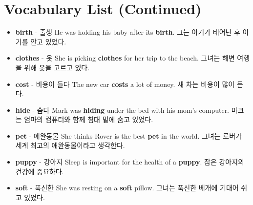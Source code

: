 \documentclass{article}
\begin{document}
\section*{Vocabulary List (Continued)}
\begin{addmargin}[1em]{1em}
    \begin{itemize}
        \item \fontsize{12pt}{14pt}\selectfont \textbf{birth} - 출생 \newline
        He was holding his baby after its \textbf{birth}. \newline
        그는 아기가 태어난 후 아기를 안고 있었다.
        
        \item \fontsize{12pt}{14pt}\selectfont \textbf{clothes} - 옷 \newline
        She is picking \textbf{clothes} for her trip to the beach. \newline
        그녀는 해변 여행을 위해 옷을 고르고 있다.
        
        \item \fontsize{12pt}{14pt}\selectfont \textbf{cost} - 비용이 들다 \newline
        The new car \textbf{costs} a lot of money. \newline
        새 차는 비용이 많이 든다.
        
        \item \fontsize{12pt}{14pt}\selectfont \textbf{hide} - 숨다 \newline
        Mark was \textbf{hiding} under the bed with his mom's computer. \newline
        마크는 엄마의 컴퓨터와 함께 침대 밑에 숨고 있었다.
        
        \item \fontsize{12pt}{14pt}\selectfont \textbf{pet} - 애완동물 \newline
        She thinks Rover is the best \textbf{pet} in the world. \newline
        그녀는 로버가 세계 최고의 애완동물이라고 생각한다.
        
        \item \fontsize{12pt}{14pt}\selectfont \textbf{puppy} - 강아지 \newline
        Sleep is important for the health of a \textbf{puppy}. \newline
        잠은 강아지의 건강에 중요하다.
        
        \item \fontsize{12pt}{14pt}\selectfont \textbf{soft} - 푹신한 \newline
        She was resting on a \textbf{soft} pillow. \newline
        그녀는 푹신한 베개에 기대어 쉬고 있었다.
        

\end{itemize}
\end{addmargin}
\end{document}
